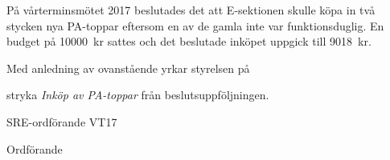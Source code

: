 \documentclass[../_main/handlingar.tex]{subfiles}
\begin{document}

På vårterminsmötet 2017 beslutades det att E-sektionen skulle köpa in två stycken nya PA-toppar eftersom en av de gamla inte var funktionsduglig. En budget på \SI{10000}{kr} sattes och det beslutade inköpet uppgick till \SI{9018}{kr}.

Med anledning av ovanstående yrkar styrelsen på

\begin{attsatser}
    \att stryka \emph{Inköp av PA-toppar} från beslutsuppföljningen.
\end{attsatser}

\begin{signatures}{2}
    \ist
	\signature{Pontus Landgren}{SRE-ordförande VT17}
    \signature{\ordf}{Ordförande}
\end{signatures}
\end{document}
